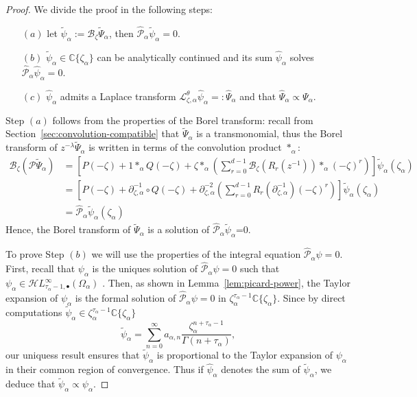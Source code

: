 \documentclass{article}
\newcommand{\singexp}[2]{\mathcal{H}L^\infty_{#1, #2}}
\newcommand{\singexpalg}[1]{\singexp{#1}{\bullet}}
\newcommand{\C}{\mathbb{C}}
\newcommand{\series}[1]{\tilde{#1}}
\newcommand{\fracderiv}[3]{\partial^{#1}_{#2, #3}}
\newcommand{\laplace}{\mathcal{L}}
\newcommand{\borel}{\mathcal{B}}
\theoremstyle{definition}
\theoremstyle{plain}
\begin{document}
\begin{proof}
We divide the proof in the following steps:
\begin{itemize}
\item[$(a)$] let $\series{\psi}_\alpha:=\borel_{\zeta}\series{\Psi}_\alpha$, then $\hat{\mathcal{P}}_\alpha\series{\psi}_\alpha=0$.
\item[$(b)$] $\tilde{\psi}_\alpha\in\C\lbrace\zeta_\alpha\rbrace$ can be analytically continued and its sum $\hat{\psi}_\alpha$ solves $\hat{\mathcal{P}}_\alpha\hat{\psi}_\alpha=0$. 
\item[$(c)$] $\hat{\psi}_\alpha$ admits a Laplace transform $\laplace_{\zeta,\alpha}^{\theta}\hat{\psi}_\alpha=:\hat{\Psi}_\alpha$ and that $\hat{\Psi}_\alpha\propto\Psi_\alpha $. 
\end{itemize}
Step $(a)$ follows from the properties of the Borel transform: recall from Section~\ref{sec:convolution-compatible} that $\tilde{\Psi}_\alpha$ is a transmonomial, thus the Borel transform of $z^{-\lambda}\tilde{\Psi}_\alpha$ is written in terms of the convolution product $\ast_{\alpha}$:   
\begin{align*}
  \borel_{\zeta}\left(\mathcal{P}\series{\Psi}_\alpha\right)&= \left[P(-\zeta)+1\ast_{\alpha} Q(-\zeta)+\zeta \ast_{\alpha} \left(\sum_{r=0}^{d-1}\borel_\zeta(R_r(z^{-1}))\ast_{\alpha}(-\zeta)^r\right)\right]\series{\psi}_\alpha(\zeta_\alpha)\\
  &=\left[P(-\zeta)+\partial_{\zeta,\alpha}^{-1}\circ Q(-\zeta)+\fracderiv{-2}{\zeta}{\alpha} \left(\sum_{r=0}^{d-1}R_r(\fracderiv{-1}{\zeta}{\alpha} )(-\zeta)^r\right)\right]\series{\psi}_\alpha(\zeta_\alpha)\\
  &=\hat{\mathcal{P}}_\alpha\tilde{\psi}_\alpha(\zeta_\alpha)
\end{align*}
Hence, the Borel transform of $\series{\Psi}_\alpha$ is a solution of $\hat{\mathcal{P}}_\alpha\series{\psi}_\alpha$=0. 

To prove Step $(b)$ we will use the properties of the integral equation $\hat{\mathcal{P}}_\alpha\psi=0$. First, recall that ${\psi}_\alpha$ is the uniques solution of $\hat{\mathcal{P}}_\alpha\psi=0$ such that $\psi_\alpha\in\singexpalg{\tau_\alpha-1}(\Omega_\alpha)$ \cite[Theorem~4]{reg-sing-volterra}. Then, as shown in Lemma~\ref{lem:picard-power}, the Taylor expansion of $\psi_\alpha$ is the formal solution of $\hat{\mathcal{P}}_\alpha\psi=0$ in $\zeta_\alpha^{\tau_\alpha-1}\C\lbrace\zeta_\alpha\rbrace$. Since by direct computations $\tilde{\psi}_\alpha\in\zeta_\alpha^{\tau_\alpha-1}\C\lbrace\zeta_\alpha\rbrace$
\[\tilde{\psi}_\alpha=\sum_{n=0}^\infty a_{\alpha,n}\frac{\zeta_\alpha^{n+\tau_\alpha-1}}{\Gamma(n+\tau_\alpha)},\]
our uniquess result ensures that $\tilde{\psi}_\alpha$ is proportional to the Taylor expansion of $\psi_\alpha$ in their common region of convergence. Thus if $\hat{\psi}_\alpha$ denotes the sum of $\tilde{\psi}_\alpha$, we deduce that $\tilde{\psi}_\alpha\propto\psi_\alpha$. 


\end{proof}
\end{document}
